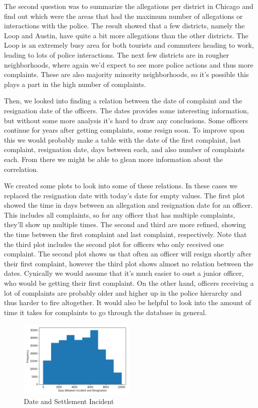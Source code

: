 \documentclass[11pt]{article}
\begin{document}
The second question was to summarize the allegations per district in Chicago and find out which were the areas that had the maximum number of allegations or interactions with the police. The result showed that a few districts, namely the Loop and Austin, have quite a bit more allegations than the other districts. The Loop is an extremely busy area for both tourists and commuters heading to work, leading to lots of police interactions. The next few districts are in rougher neighborhoods, where again we’d expect to see more police actions and thus more complaints. These are also majority minority neighborhoods, so it’s possible this plays a part in the high number of complaints.

Then, we looked into finding a relation between the date of complaint and the resignation date of the officers. The dates provides some interesting information, but without some more analysis it’s hard to draw any conclusions. Some officers continue for years after getting complaints, some resign soon. To improve upon this we would probably make a table with the date of the first complaint, last complaint, resignation date, days between each, and also number of complaints each. From there we might be able to glean more information about the correlation.

We created some plots to look into some of these relations. In these cases we replaced the resignation date with today’s date for empty values. The first plot showed the time in days between an allegation and resignation date for an officer. This includes all complaints, so for any officer that has multiple complaints, they’ll show up multiple times. The second and third are more refined, showing the time between the first complaint and last complaint, respectively. Note that the third plot includes the second plot for officers who only received one complaint. The second plot shows us that often an officer will resign shortly after their first complaint, however the third plot shows almost no relation between the dates. Cynically we would assume that it’s much easier to oust a junior officer, who would be getting their first complaint. On the other hand, officers receiving a lot of complaints are probably older and higher up in the police hierarchy and thus harder to fire altogether. It would also be helpful to look into the amount of time it takes for complaints to go through the database in general. 

\begin{figure}[h!]
\centering
\caption{Date and Settlement Incident}
\includegraphics[width=0.5\textwidth]{complaint1.png}
\end{figure}
\end{document}
